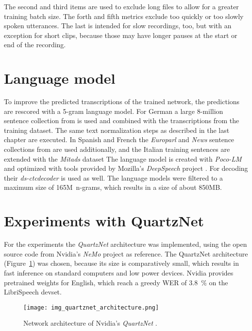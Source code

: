 \documentclass[a4paper]{article}
\begin{document}
The second and third items are used to exclude long files to allow for a greater training batch size. The forth and fifth metrics exclude too quickly or too slowly spoken utterances. The last is intended for slow recordings, too, but with an exception for short clips, because those may have longer pauses at the start or end of the recording.


\section{Language model}
\label{sec:langm}

To improve the predicted transcriptions of the trained network, the predictions are rescored with a 5-gram language model. For German a large 8-million sentence collection from \cite{SENDE} is used and combined with the transcriptions from the training dataset. The same text normalization steps as described in the last chapter are executed. In Spanish and French the \textit{Europarl} and \textit{News} sentence collections from \cite{STATMT} are used additionally, and the Italian training sentences are extended with the \textit{Mitads} dataset \cite{MITADS} The language model is created with \textit{Poco-LM} \cite{POCOLM} and optimized with tools provided by Mozilla's \textit{DeepSpeech} project \cite{DEPSPE}. For decoding their \textit{ds-ctcdecoder} is used as well. The language models were filtered to a maximum size of \mbox{165M n-grams}, which results in a size of about 850MB.



\section{Experiments with QuartzNet}
\label{sec:exqn}

For the experiments the \textit{QuartzNet} architecture \cite{QNET} was implemented, using the open source code from Nvidia's \textit{NeMo} project \cite{NEMO} as reference.
The QuartzNet architecture (Figure~\ref{fig:qn}) was chosen, because its size is comparatively small, which results in fast inference on standard computers and low power devices. Nvidia provides pretrained weights for English, which reach a greedy WER of \SI{3.8}{\percent} on the LibriSpeech devset.

\begin{figure}[htb]
	\centering
	\texttt{[image: img\_quartznet\_architecture.png]}
	\caption{Network architecture of Nvidia's \textit{QuartzNet} \cite{QNET}.}
	\label{fig:qn}
\end{figure}
\end{document}
